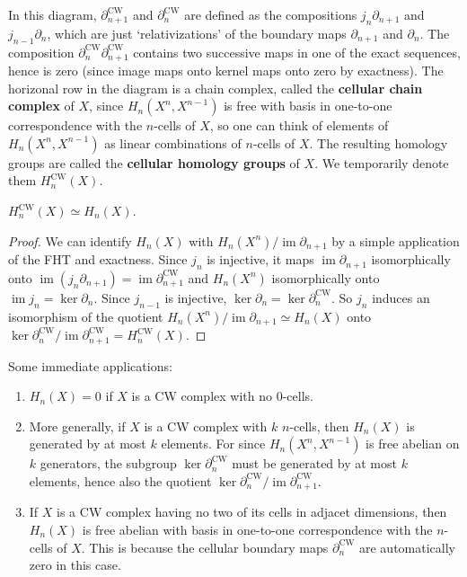 In this diagram, $\partial _{n+1}^{\text{CW}}$ and $\partial _n^{\text{CW}} $ are defined as the compositions $j_n \partial _{n+1}$ and $j_{n-1}\partial _n $, which are just `relativizations' of the boundary maps $\partial _{n+1}$ and $\partial _n $. The composition $\partial _n ^{\text{CW}}\partial _{n+1}^{\text{CW}}$ contains two successive maps in one of the exact sequences, hence is zero (since image maps onto kernel maps onto zero by exactness). The horizonal row in the diagram is a chain complex, called the \textbf{cellular chain complex} of $X$, since $H_n (X^n ,X^{n-1})$ is free with basis in one-to-one correspondence with the $n$-cells of $X$, so one can think of elements of $H_n (X^n ,X^{n-1})$ as linear combinations of $n$-cells of $X$. The resulting homology groups are called the \textbf{cellular homology groups} of $X$. We temporarily denote them $H_n ^{\text{CW}}(X)$.
\begin{theorem}
    $H_n ^{\text{CW}}(X)\simeq H_n (X)$.
\end{theorem}
\begin{proof}
    We can identify $H_n (X)$ with $H_n (X^n ) / \operatorname{im}\partial _{n+1}$ by a simple application of the FHT and exactness. Since $j_n $ is injective, it maps $\operatorname{im}\partial _{n+1}$ isomorphically onto $\operatorname{im}(j_n \partial _{n+1})=\operatorname{im}\partial ^{\text{CW}}_{n+1}$ and $H_n (X^n )$ isomorphically onto $\operatorname{im}j_n =\ker \partial _n $. Since $j_{n-1}$ is injective, $\operatorname{ker}\partial _n =\operatorname{ker}\partial _n ^{\text{CW}}$. So $j_n $ induces an isomorphism of the quotient $H_n (X^n ) / \operatorname{im}\partial _{n+1}\simeq H_n (X)$ onto $\ker \partial _n ^{\text{CW}} / \operatorname{im}\partial _{n+1}^{\text{CW}}=H_n ^{\text{CW}}(X)$.
\end{proof}
Some immediate applications:
\begin{enumerate}[label=(\roman*)]
    \item $H_n (X)=0$ if $X$ is a CW complex with no $0$-cells.
    \item More generally, if $X$ is a CW complex with $k$ $n$-cells, then $H_n (X)$ is generated by at most $k$ elements. For since $H_n (X^n ,X^{n-1})$ is free abelian on $k$ generators, the subgroup  $\ker \partial _n ^{\text{CW}}$ must be generated by at most $k$ elements, hence also the quotient $\ker \partial _n ^{\text{CW}} / \operatorname{im}\partial _{n+1}^{\text{CW}}$.
    \item If $X$ is a CW complex having no two of its cells in adjacet dimensions, then $H_n (X)$ is free abelian with basis in one-to-one correspondence with the $n$-cells of $X$. This is because the cellular boundary maps $\partial _n ^{\text{CW}}$ are automatically zero in this case.
\end{enumerate}
